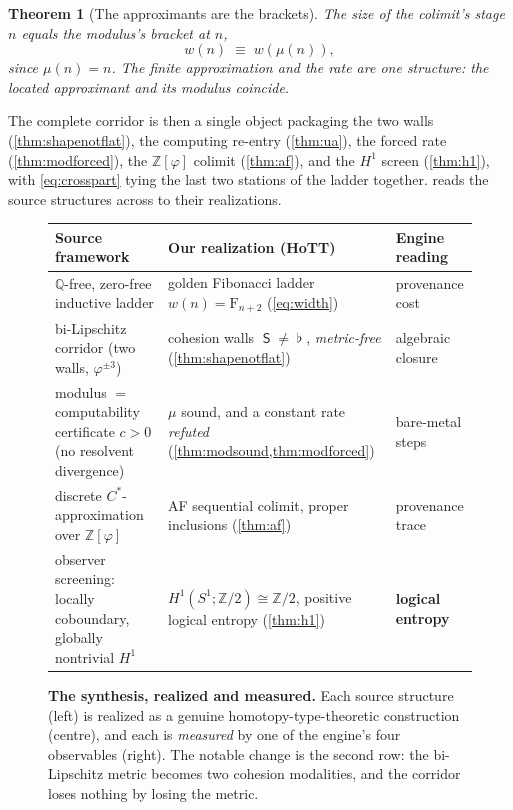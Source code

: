 \documentclass[11pt,letterpaper]{article}
\theoremstyle{plain}
\newtheorem{theorem}{Theorem}[section]
\theoremstyle{definition}
\theoremstyle{remark}
\newcommand{\shapeM}{\mathop{\mathsf{S}}\nolimits}      %
\newcommand{\flatM}{\mathop{\flat}\nolimits}            %
\newcommand{\ZZ}{\mathbb{Z}}
\newcommand{\QQ}{\mathbb{Q}}
\newcommand{\Zphi}{\ZZ[\varphi]}
\newcommand{\bbtwo}{\mathbb{Z}/2}
\newcommand{\fib}{\mathrm{F}}                           %
\newcommand{\modulus}{\mu}
\begin{document}
\begin{theorem}[The approximants are the brackets]\label{thm:crosspart}
The size of the colimit's stage $n$ equals the modulus's bracket at $n$,
\begin{equation}\label{eq:crosspart}
  w(n) \;\equiv\; w(\modulus(n)),
\end{equation}
since $\modulus(n)=n$. The finite approximation and the rate are one
structure: the located approximant and its modulus coincide.
\end{theorem}

\noindent The complete corridor is then a single object packaging the two walls
(\cref{thm:shapenotflat}), the computing re-entry (\cref{thm:ua}), the forced rate
(\cref{thm:modforced}), the $\Zphi$ colimit (\cref{thm:af}), and the $H^1$ screen
(\cref{thm:h1}), with \cref{eq:crosspart} tying the last two stations of the
ladder together.  reads the source structures across to
their realizations.

\begin{figure}[t]
\centering
\renewcommand{\arraystretch}{1.35}
\footnotesize
\begin{tabular}{@{}>{\raggedright\arraybackslash}p{4.7cm}
                  >{\raggedright\arraybackslash}p{5.6cm}
                  >{\raggedright\arraybackslash}p{3.4cm}@{}}
\toprule
\textbf{Source framework} & \textbf{Our realization (HoTT)} & \textbf{Engine reading} \\
\midrule
$\QQ$-free, zero-free inductive ladder &
golden Fibonacci ladder $w(n)=\fib_{n+2}$ (\cref{eq:width}) &
provenance cost \\[1pt]
bi-Lipschitz corridor (two walls, $\varphi^{\pm3}$) &
cohesion walls $\shapeM\neq\flatM$, \emph{metric-free} (\cref{thm:shapenotflat}) &
algebraic closure \\[1pt]
modulus $=$ computability certificate $c>0$ (no resolvent divergence) &
$\modulus$ sound, and a constant rate \emph{refuted} (\cref{thm:modsound,thm:modforced}) &
bare-metal steps \\[1pt]
discrete $C^\ast$-approximation over $\Zphi$ &
AF sequential colimit, proper inclusions (\cref{thm:af}) &
provenance trace \\[1pt]
observer screening: locally coboundary, globally nontrivial $H^1$ &
$H^1(S^1;\bbtwo)\cong\bbtwo$, positive logical entropy (\cref{thm:h1}) &
\textbf{logical entropy} \\
\bottomrule
\end{tabular}
\caption{\textbf{The synthesis, realized and measured.} Each source
structure (left) is realized as a genuine homotopy-type-theoretic construction
(centre), and each is \emph{measured} by one of the engine's four observables
(right). The notable change is the second row: the bi-Lipschitz metric becomes two
cohesion modalities, and the corridor loses nothing by losing the metric.}
\label{fig:rosetta}
\end{figure}
\end{document}
